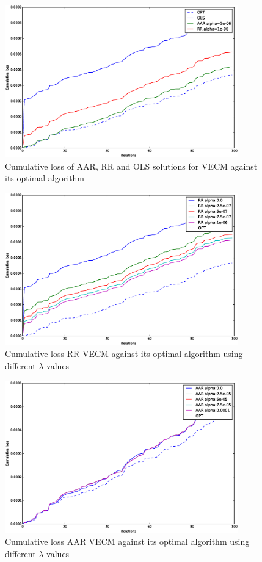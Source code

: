 \begin{figure}[!h]
  \centering
  \includegraphics[width=0.9\textwidth]{img/onlinecomparison}
  \caption{Cumulative loss of AAR, RR and OLS solutions for VECM against its optimal algorithm}
  \label{fig:onlinecomparison}
\end{figure}


\begin{figure}[!h]
  \centering
  \includegraphics[width=0.9\textwidth]{img/RRcomparison}
  \caption{Cumulative loss RR VECM against its optimal algorithm using different $\lambda$ values}
  \label{fig:RRcomparison}
\end{figure}


\begin{figure}[!h]
  \centering
  \includegraphics[width=0.9\textwidth]{img/AARcomparison}
  \caption{Cumulative loss AAR VECM against its optimal algorithm using different $\lambda$ values}
  \label{fig:AARcomparison}
\end{figure}

